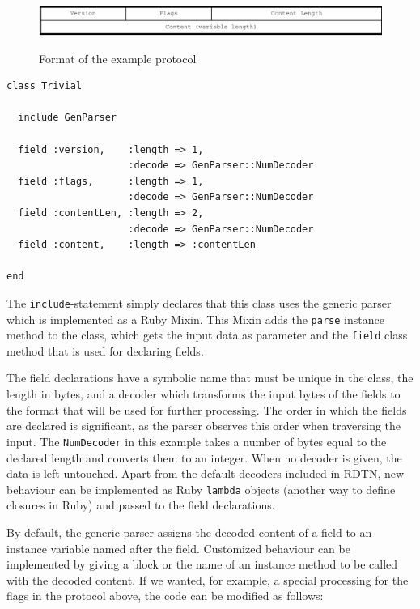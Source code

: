 \documentclass[a4paper]{article}
\begin{document}
\begin{figure}[h]
\begin{center}
\includegraphics[width=\columnwidth]{example-format.pdf}\\
\caption{\label{fig.example-format} Format of the example protocol}
\end{center}
\end{figure}

\begin{verbatim}
class Trivial

  include GenParser

  field :version,    :length => 1,
                     :decode => GenParser::NumDecoder
  field :flags,      :length => 1,
                     :decode => GenParser::NumDecoder
  field :contentLen, :length => 2,
                     :decode => GenParser::NumDecoder
  field :content,    :length => :contentLen

end
\end{verbatim}

The {\tt include}-statement simply declares that this class uses the generic
parser which is implemented as a Ruby Mixin. This Mixin adds the {\tt parse}
instance method to the class, which gets the input data as parameter and
the {\tt field} class method that is used for declaring fields.

 The field declarations have a symbolic name that must be unique in the class,
the length in bytes, and a decoder which transforms the input bytes of the
fields to the format that will be used for further processing.  The order in
which the fields are declared is significant, as the parser observes this order
when traversing the input.  The {\tt NumDecoder} in this example takes a number
of bytes equal to the declared length and converts them to an integer. When no
decoder is given, the data is left untouched. Apart from the default decoders
included in RDTN, new behaviour can be implemented as Ruby {\tt lambda} objects
(another way to define closures in Ruby) and passed to the field declarations.

By default, the generic parser assigns the decoded content of a field to an
instance variable named after the field. Customized behaviour can be implemented
by giving a block or the name of an instance method to be called with the
decoded content. If we wanted, for example, a special processing for the flags
in the protocol above, the code can be modified as follows:
\end{document}
